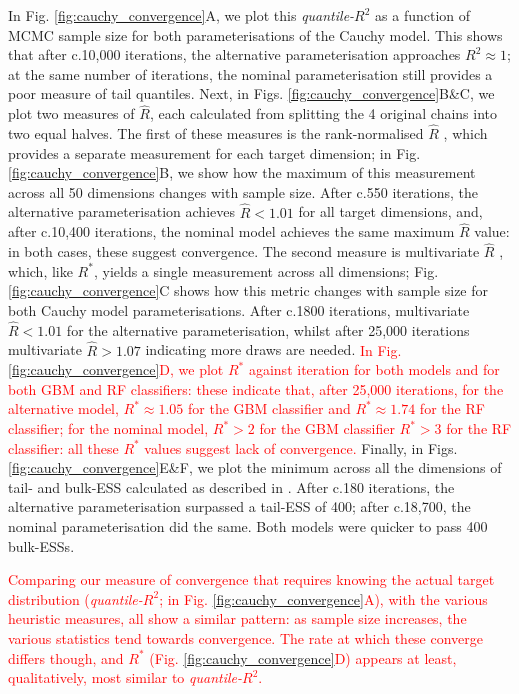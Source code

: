 \documentclass{article}
\begin{document}
In Fig. \ref{fig:cauchy_convergence}A, we plot this \textit{quantile-$R^2$} as a function of MCMC sample size for both parameterisations of the Cauchy model. This shows that after c.10,000 iterations, the alternative parameterisation approaches $R^2\approx 1$; at the same number of iterations, the nominal parameterisation still provides a poor measure of tail quantiles. Next, in Figs. \ref{fig:cauchy_convergence}B\&C, we plot two measures of $\widehat{R}$, each calculated from splitting the 4 original chains into two equal halves. The first of these measures is the rank-normalised $\widehat{R}$ \citep{vehtari2019rank}, which provides a separate measurement for each target dimension; in Fig. \ref{fig:cauchy_convergence}B, we show how the maximum of this measurement across all 50 dimensions changes with sample size. After c.550 iterations, the alternative parameterisation achieves $\widehat{R}<1.01$ for all target dimensions, and, after c.10,400 iterations, the nominal model achieves the same maximum $\widehat{R}$ value: in both cases, these suggest convergence. The second measure is multivariate $\widehat{R}$ \citep{brooks1998general}, which, like $R^*$, yields a single measurement across all dimensions; Fig. \ref{fig:cauchy_convergence}C shows how this metric changes with sample size for both Cauchy model parameterisations. After c.1800 iterations, multivariate $\widehat{R}<1.01$ for the alternative parameterisation, whilst after 25,000 iterations multivariate $\widehat{R}>1.07$ indicating more draws are needed. \textcolor{red}{In Fig. \ref{fig:cauchy_convergence}D, we plot $R^*$ against iteration for both models and for both GBM and RF classifiers: these indicate that, after 25,000 iterations, for the alternative model, $R^*\approx 1.05$ for the GBM classifier and $R^*\approx 1.74$ for the RF classifier; for the nominal model, $R^*>2$ for the GBM classifier $R^*>3$ for the RF classifier: all these $R^*$ values suggest lack of convergence.} Finally, in Figs. \ref{fig:cauchy_convergence}E\&F, we plot the minimum across all the dimensions of tail- and bulk-ESS calculated as described in \cite{vehtari2019rank}. After c.180 iterations, the alternative parameterisation surpassed a tail-ESS of 400; after c.18,700, the nominal parameterisation did the same. Both models were quicker to pass 400 bulk-ESSs.

\textcolor{red}{Comparing our measure of convergence that requires knowing the actual target distribution (\textit{quantile-$R^2$}; in Fig. \ref{fig:cauchy_convergence}A), with the various heuristic measures, all show a similar pattern: as sample size increases, the various statistics tend towards convergence. The rate at which these converge differs though, and $R^*$ (Fig. \ref{fig:cauchy_convergence}D) appears at least, qualitatively, most similar to \textit{quantile-$R^2$}.}
\end{document}
